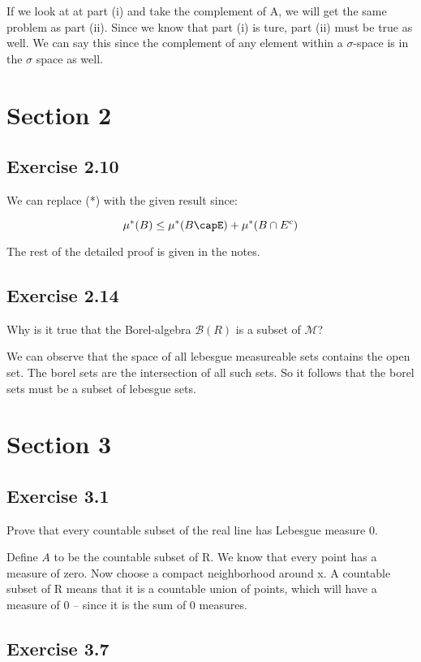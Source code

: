 \documentclass[a4paper]{article}
\begin{document}
If we look at at part (i) and take the complement of A, we will get the same problem as part (ii). Since we know that part (i) is ture, part (ii) must be true as well. We can say this since the complement of any element within a $\sigma$-space is in the $\sigma$ space as well.

\section*{Section 2}

\subsection*{Exercise 2.10}

We can replace (*) with the given result since:

$$\mu^*(B) \leq \mu^*(B\capE) + \mu^*(B\cap E^c)$$ %

The rest of the detailed proof is given in the notes.


\subsection*{Exercise 2.14}
Why is it true that the Borel-algebra $\mathcal{B}(R)$ is a subset of $\mathcal{M}$?

We can observe that the space of all lebesgue measureable sets contains the open set. The borel sets are the intersection of all such sets. So it follows that the borel sets must be a subset of lebesgue sets.

\section*{Section 3}

\subsection*{Exercise 3.1}
Prove that every countable subset of the real line has Lebesgue measure 0.

Define $A$ to be the countable subset of R. We know that every point has a measure of zero. Now choose a compact neighborhood around x. A countable subset of R means that it is a countable union of points, which will have a measure of 0 -- since it is the sum of 0 measures.

\subsection*{Exercise 3.7}
\end{document}
